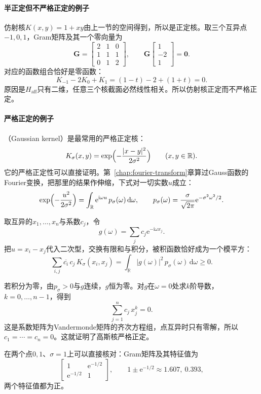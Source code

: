 \paragraph{半正定但不严格正定的例子}

仿射核$K(x,y)=1+xy$由上一节的空间得到，所以是正定核。取三个互异点$-1,0,1$，Gram矩阵及其一个零向量为
\[
\bm G=\begin{bmatrix}2&1&0\\1&1&1\\0&1&2\end{bmatrix},\qquad
\bm G\begin{bmatrix}1\\-2\\1\end{bmatrix}=\bm 0 .
\]
对应的函数组合恰好是零函数：
\[
K_{-1}-2K_0+K_1=(1-t)-2+(1+t)=0 .
\]
原因是$H_{\mathrm{aff}}$只有二维，任意三个核截面必然线性相关。所以仿射核正定而不严格正定。

\paragraph{严格正定的例子}

（Gaussian kernel）是最常用的严格正定核：
\[
K_\sigma(x,y)=\exp\Bigl(-\frac{\lvert x-y\rvert^2}{2\sigma^2}\Bigr)\qquad(x,y\in\mathbb R).
\]
它的严格正定性可以直接证明。第~\ref{chap:fourier-transform}章算过Gauss函数的Fourier变换，把那里的结果作伸缩，下式对一切实数$u$成立：
\[
\exp\Bigl(-\frac{u^2}{2\sigma^2}\Bigr)=\int_{\mathbb R}\mathrm e^{\mathrm i\omega u}\,p_\sigma(\omega)\,\mathrm d\omega,\qquad
p_\sigma(\omega)=\frac{\sigma}{\sqrt{2\pi}}\mathrm e^{-\sigma^2\omega^2/2}.
\]

取互异的$x_1,\ldots,x_n$与系数$c_j$，令
\[
g(\omega)=\sum_jc_j\mathrm e^{-\mathrm i\omega x_j}.
\]
把$u=x_i-x_j$代入二次型，交换有限和与积分，被积函数恰好成为一个模平方：
\[
\sum_{i,j}\overline{c_i}\,c_j\,K_\sigma(x_i,x_j)=\int_{\mathbb R}\lvert g(\omega)\rvert^2\,p_\sigma(\omega)\,\mathrm d\omega\geq0 .
\]

若积分为零，由$p_\sigma>0$与$g$连续，$g$恒为零。对$g$在$\omega=0$处求$k$阶导数，$k=0,\ldots,n-1$，得到
\[
\sum_{j=1}^nc_j\,x_j^k=0 .
\]
这是系数矩阵为Vandermonde矩阵的齐次方程组，点互异时只有零解，所以$c_1=\cdots=c_n=0$。这就证明了高斯核严格正定。

在两个点$0,1$、$\sigma=1$上可以直接核对：Gram矩阵及其特征值为
\[
\begin{bmatrix}1&\mathrm e^{-1/2}\\\mathrm e^{-1/2}&1\end{bmatrix},\qquad
1\pm\mathrm e^{-1/2}\approx1.607,\ 0.393,
\]
两个特征值都为正。

